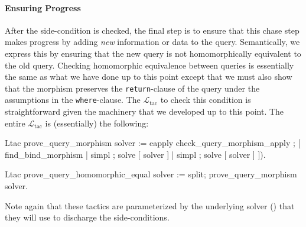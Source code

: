 \documentclass[preprint]{sigplanconf}
\newcommand{\WHERE}{{\tt where} \ }
\newcommand{\RETURN}{{\tt return} \ }
\newcommand{\ltac}[0]{\ensuremath{\mathcal{L}_{\mathrm{tac}}}}
\begin{document}
\paragraph{Ensuring Progress}
After the side-condition is checked, the final step is to ensure that this chase step makes progress by adding \emph{new} information or data to the query.
Semantically, we express this by ensuring that the new query is not homomorphically equivalent to the old query.
Checking homomorphic equivalence between queries is essentially the same as what we have done up to this point except that we must also show that the morphism preserves the {\tt return}-clause of the query under the assumptions in the {\tt where}-clause.
The \ltac{} to check this condition is straightforward given the machinery that we developed up to this point.
The entire \ltac{} is (essentially) the following:
\begin{coq}
Ltac prove_query_morphism solver :=
  eapply check_query_morphism_apply ;
    [ find_bind_morphism
    | simpl ; solve [ solver ]
    | simpl ; solve [ solver ] ]).

Ltac prove_query_homomorphic_equal solver :=
  split; prove_query_morphism solver.
\end{coq}
Note again that these tactics are parameterized by the underlying solver () that they will use to discharge the side-conditions.
\end{document}

